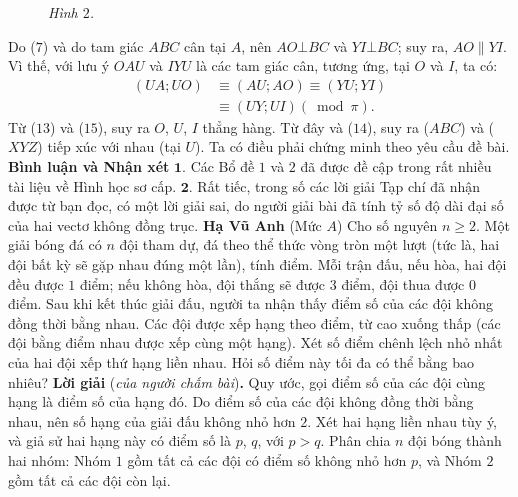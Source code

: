 \begin{multicols}{2}
\begin{figure}[H]
		\vspace*{-10pt}
		\caption{\small\textit{\color{thachthuctoanhoc}Hình $2$.}}
		\vspace*{-10pt}
	\end{figure}
	Do ($7$) và do tam giác $ABC$ cân tại $A$, nên $AO \bot BC$ và $YI \bot BC$; suy ra, $AO \parallel YI$. Vì thế, với lưu ý $OAU$ và $IYU$ là các tam giác cân, tương ứng, tại $O$ và $I$, ta có:
	\begin{align*}
		\left( {UA;UO} \right) &\equiv \left( {AU;AO} \right) \equiv \left( {YU;YI} \right) \\
		&\equiv \left( {UY;UI} \right)\left( {\bmod \pi } \right). \tag{$15$}
	\end{align*}
	Từ ($13$) và ($15$), suy ra $O$, $U$, $I$ thẳng hàng. Từ đây và ($14$), suy ra ($ABC$) và ($XYZ$) tiếp xúc với nhau (tại $U$). Ta có điều phải chứng minh theo yêu cầu đề bài.
	\vskip 0.05cm
	\textbf{\color{thachthuctoanhoc}Bình luận và Nhận xét}
	\vskip 0.05cm
	$\pmb{1.}$ Các Bổ đề $1$ và $2$ đã được đề cập trong rất nhiều tài liệu về Hình học sơ cấp.
	\vskip 0.05cm
	$\pmb{2.}$ Rất tiếc, trong số các lời giải Tạp chí đã nhận được từ bạn đọc, có một lời giải sai, do người giải bài đã tính tỷ số độ dài đại số của hai vectơ không đồng trục.
	\vskip 0.1cm
	\hfill	\textbf{\color{thachthuctoanhoc}Hạ Vũ Anh}
	\vskip 0.1cm
	{}
	(Mức $A$) Cho số nguyên $n \ge 2$. Một giải bóng đá có $n$ đội tham dự, đá theo thể thức vòng tròn một lượt (tức là, hai đội bất kỳ sẽ gặp nhau đúng một lần), tính điểm. Mỗi trận đấu, nếu hòa, hai đội đều được $1$ điểm; nếu không hòa, đội thắng sẽ được $3$ điểm, đội thua được $0$ điểm. Sau khi kết thúc giải đấu, người ta nhận thấy điểm số của các đội không đồng thời bằng nhau. Các đội được xếp hạng theo điểm, từ cao xuống thấp (các đội bằng điểm nhau được xếp cùng một hạng). Xét số điểm chênh lệch nhỏ nhất của hai đội xếp thứ hạng liền nhau. Hỏi số điểm này tối đa có thể bằng bao nhiêu?
	\vskip 0.05cm
	\textbf{\color{thachthuctoanhoc}Lời giải} (\textit{của người chấm bài})\textbf{\color{thachthuctoanhoc}.}
	\vskip 0.05cm
	Quy ước, gọi điểm số của các đội cùng hạng là điểm số của hạng đó.
	\vskip 0.05cm
	Do điểm số của các đội không đồng thời bằng nhau, nên số hạng của giải đấu không nhỏ hơn $2$.
	\vskip 0.05cm
	Xét hai hạng liền nhau tùy ý, và giả sử hai hạng này có điểm số là $p$, $q$, với $p > q$.
	\vskip 0.05cm
	Phân chia $n$ đội bóng thành hai nhóm: Nhóm $1$ gồm tất cả các đội có điểm số không nhỏ hơn $p$, và Nhóm $2$ gồm tất cả các đội còn lại.
	\vskip 0.05cm

\end{multicols}

